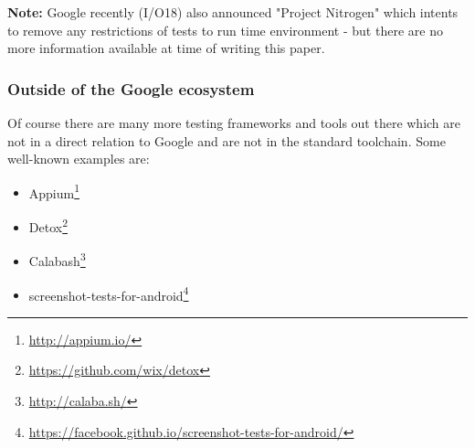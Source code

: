 \begin{mdframed}[style=InfoBox,align=center]
	\textbf{Note:} Google recently (I/O18) also announced "Project Nitrogen" which intents to remove any restrictions of tests to run time environment - but there are no more information available at time of writing this paper.
\end{mdframed}

\subsubsection{Outside of the Google ecosystem}

Of course there are many more testing frameworks and tools out there which are not in a direct relation to Google and are not in the standard toolchain. Some well-known examples are:

\begin{itemize}
	\item Appium\footnote{\url{http://appium.io/}}
	\item Detox\footnote{\url{https://github.com/wix/detox}}
	\item Calabash\footnote{\url{http://calaba.sh/}}
	\item screenshot-tests-for-android\footnote{\url{https://facebook.github.io/screenshot-tests-for-android/}}
\end{itemize}



